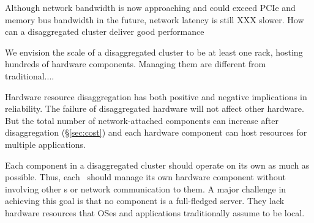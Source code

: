 \documentclass[10pt,times,twocolumn]{z2-article}
\begin{document}
Although network bandwidth is now approaching and could exceed PCIe and memory bus bandwidth in the
future, network latency is still XXX slower.
How can a disaggregated cluster deliver good performance

We envision the scale of a disaggregated cluster to be at least one rack, 
hosting hundreds of hardware components.
Managing them are different from traditional....

Hardware resource disaggregation has both positive and negative implications in reliability.
The failure of disaggregated hardware will not affect other hardware.
But the total number of network-attached components can increase after disaggregation (\S\ref{sec:cost})
and each hardware component can host resources for multiple applications.


Each component in a disaggregated cluster should operate on its own as much as possible.
Thus, each \microos\ should manage its own hardware component
without involving other \microos{}s or network communication to them.
A major challenge in achieving this goal is that no component is a full-fledged server. 
They lack hardware resources that OSes and applications traditionally assume to be local.
\end{document}
